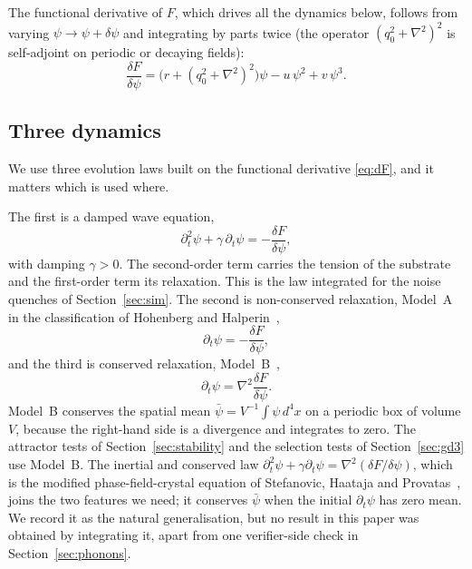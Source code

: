 \documentclass[a4paper,11pt]{article}
\numberwithin{equation}{section}
\theoremstyle{jsplain}
\theoremstyle{jsrem}
\begin{document}
The functional derivative of $F$, which drives all the dynamics below, follows from varying $\psi\to\psi+\delta\psi$ and integrating by parts twice (the operator $(q_0^2+\nabla^2)^2$ is self-adjoint on periodic or decaying fields):
\begin{equation}\label{eq:dF}
\frac{\delta F}{\delta\psi}=\big(r+(q_0^2+\nabla^2)^2\big)\psi-u\,\psi^2+v\,\psi^3 .
\end{equation}

\subsection{Three dynamics}

We use three evolution laws built on the functional derivative \eqref{eq:dF}, and it matters which is used where.

The first is a damped wave equation,
\begin{equation}\label{eq:dw}
\partial_t^2\psi+\gamma\,\partial_t\psi=-\frac{\delta F}{\delta\psi},
\end{equation}
with damping $\gamma>0$. The second-order term carries the tension of the substrate and the first-order term its relaxation. This is the law integrated for the noise quenches of Section~\ref{sec:sim}. The second is non-conserved relaxation, Model~A in the classification of Hohenberg and Halperin~\cite{ref4},
\begin{equation}\label{eq:A}
\partial_t\psi=-\frac{\delta F}{\delta\psi},
\end{equation}
and the third is conserved relaxation, Model~B~\cite{ref4},
\begin{equation}\label{eq:B}
\partial_t\psi=\nabla^2\frac{\delta F}{\delta\psi}.
\end{equation}
Model~B conserves the spatial mean $\bar\psi=V^{-1}\int\psi\,d^4x$ on a periodic box of volume $V$, because the right-hand side is a divergence and integrates to zero. The attractor tests of Section~\ref{sec:stability} and the selection tests of Section~\ref{sec:gd3} use Model~B. The inertial and conserved law $\partial_t^2\psi+\gamma\partial_t\psi=\nabla^2(\delta F/\delta\psi)$, which is the modified phase-field-crystal equation of Stefanovic, Haataja and Provatas~\cite{ref46}, joins the two features we need; it conserves $\bar\psi$ when the initial $\partial_t\psi$ has zero mean. We record it as the natural generalisation, but no result in this paper was obtained by integrating it, apart from one verifier-side check in Section~\ref{sec:phonons}.
\end{document}
